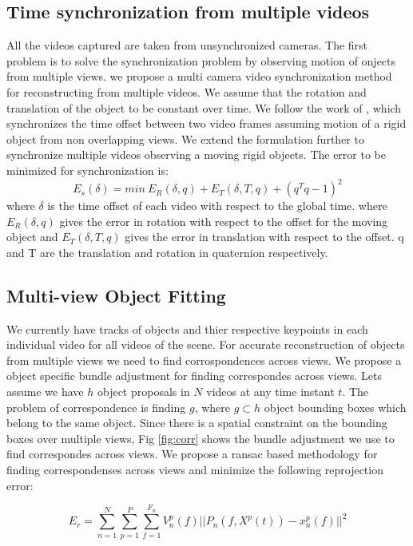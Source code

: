 \documentclass[10pt,twocolumn,letterpaper]{article}
\begin{document}
\subsection{Time synchronization from multiple videos}
All the videos captured are taken from unsynchronized cameras. The first problem is to solve the synchronization problem by observing motion of onjects from multiple views. we propose a multi camera video synchronization method for reconstructing from multiple videos. We assume that the rotation and translation of the object to be constant over time. We follow the work of \cite{gaspar2014synchronization}, which synchronizes the time offset between two video frames assuming motion of a rigid object from non overlapping views. We extend the formulation further to synchronize multiple videos observing a moving rigid objects. The error to be minimized for synchronization is:
\begin{equation}
  	E_s(\delta) = min \ E_{R}(\delta,q) + E_{T}(\delta,T,q) + (q^{T} q -1)^2
\end{equation}
where $\delta$ is the time offset of each video with respect to the global time. where $E_R(\delta,q)$ gives the error in rotation with respect to the offset for the moving object and $E_T(\delta,T,q)$ gives the error in translation with respect to the offset. q and T are the translation and rotation in quaternion respectively.


\subsection{Multi-view Object Fitting}
We currently have tracks of objects and thier respective keypoints in each individual video for all videos of the scene. For accurate reconstruction of objects from multiple views we need to find corrospondences across views. We propose a object specific bundle adjustment for finding correspondes across views. Lets assume we have $h$ object proposals in $N$ videos at any time instant $t$. The problem of correspondence is finding $g$, where $g \subset h$ object bounding boxes which belong to the same object. Since there is a spatial constraint on the bounding boxes over multiple views, Fig \ref{fig:corr} shows the bundle adjustment we use to find correspondes across views. We propose a ransac based methodology for finding correspondenses across views and minimize the following reprojection error:

\begin{equation}
  	E_r =\sum_{n=1}^{N} \sum_{p=1}^P \sum_{f=1}^{F_n} V_n^p(f) ||P_n(f,X^p(t)) - x_n^p(f)||^2
\end{equation}
   
\end{document}
